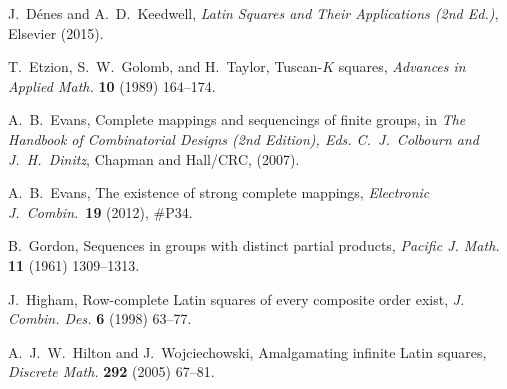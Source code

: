\documentclass[12pt,a4paper]{article}
\begin{document}
\begin{thebibliography}{99}
J.~D{\'e}nes and A.~D.~Keedwell, {\em Latin Squares and Their Applications (2nd Ed.)}, Elsevier (2015).

T.~Etzion, S.~W.~Golomb, and H.~Taylor, Tuscan-$K$ squares, {\em Advances in Applied Math.} {\bf 10} (1989) 164--174.

A.~B.~Evans, 
Complete mappings and sequencings of finite groups, in {\em The Handbook of Combinatorial Designs (2nd Edition), Eds. C.~J.~Colbourn and J.~H.~Dinitz}, Chapman and Hall/CRC, (2007).

A.~B.~Evans, The existence of strong complete mappings, {\em Electronic J.~Combin.}~{\bf 19} (2012), \#P34.



 B.~Gordon, Sequences in groups with distinct partial products, {\em Pacific J. Math.} {\bf 11} (1961) 1309--1313.

J.~Higham, Row-complete Latin squares of every composite order exist, {\em J. Combin. Des.} {\bf 6} (1998) 63--77. 

A.~J.~W.~Hilton and J.~Wojciechowski, Amalgamating infinite Latin squares, {\em Discrete Math.} {\bf 292} (2005) 67--81.








\end{thebibliography}
\end{document}
